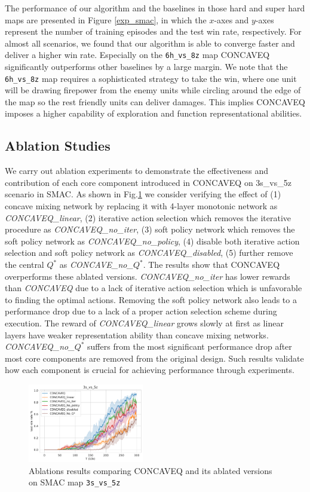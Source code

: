 The performance of our algorithm and the baselines in those hard and super hard maps are presented in Figure \ref{exp_smac}, in which the $x$-axes and $y$-axes represent the number of training episodes and the test win rate, respectively. For almost all scenarios, we found that our algorithm is able to converge faster and deliver a higher win rate. Especially on the \texttt{6h\_vs\_8z} map CONCAVEQ significantly outperforms other baselines by a large margin. We note that the \texttt{6h\_vs\_8z} map requires a sophisticated strategy to take the win, where one unit will be drawing firepower from the enemy units while circling around the edge of the map so the rest friendly units can deliver damages. This implies CONCAVEQ imposes a higher capability of exploration and function representational abilities.





\subsection{Ablation Studies}
We carry out ablation experiments to demonstrate the effectiveness and contribution of each core component introduced in CONCAVEQ on 3s\_vs\_5z scenario in SMAC. As shown in Fig.\ref{exp_ablation} we consider verifying the effect of (1) concave mixing network by replacing it with 4-layer monotonic network as \textit{CONCAVEQ\_linear},  (2) iterative action selection which removes the iterative procedure as \textit{CONCAVEQ\_no\_iter}, (3) soft policy network which removes the soft policy network as \textit{CONCAVEQ\_no\_policy},  (4) disable both iterative action selection and soft policy network as \textit{CONCAVEQ\_disabled}, (5) further remove the central $Q^*$ as \textit{CONCAVE\_no\_$Q^*$}. The results show that CONCAVEQ overperforms these ablated versions. \textit{CONCAVEQ\_no\_iter} has lower rewards than \textit{CONCAVEQ} due to a lack of iterative action selection which is unfavorable to finding the optimal actions. Removing the soft policy network also leads to a performance drop due to a lack of a proper action selection scheme during execution.  The reward of \textit{CONCAVEQ\_linear} grows slowly at first as linear layers have weaker representation ability than concave mixing networks.  \textit{CONCAVEQ\_no\_$Q^*$} suffers from the most significant performance drop after most core components are removed from the original design. Such results validate how each component is crucial for achieving performance through experiments. 

\setlength\intextsep{0pt}
\begin{figure}
\centering
\includegraphics[width=0.45\textwidth]{new_figure/3s_vs_5z_win_rate_comp_300_tab10_ablation.pdf}
\caption{Ablations results comparing CONCAVEQ and its  ablated versions on SMAC map \texttt{3s\_vs\_5z}}
\label{exp_ablation}
\end{figure}

